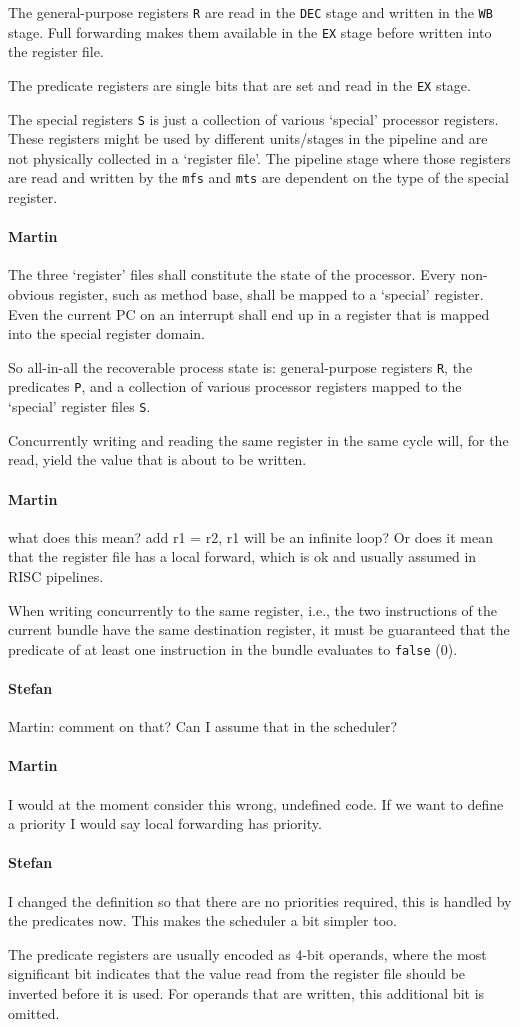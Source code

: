 \documentclass{IEEEtran}
\newcommand{\code}[1]{{\texttt{#1}}}
\newcommand{\comment}[3]{\paragraph*{\textbf{#1}}{\color{#3}#2}}
\newcommand{\martin}[1]{\comment{Martin}{#1}{Blue}}
\newcommand{\stefan}[1]{\comment{Stefan}{#1}{RoyalPurple}}
\begin{document}
The general-purpose registers \texttt{R} are read in the \code{DEC} stage
and written in the \code{WB} stage. Full forwarding makes them available
in the \code{EX} stage before written into the register file.

The predicate registers are single bits that are set and read in the \code{EX}
stage.

The special registers \code{S} is just a collection of various `special'
processor registers. These registers might be used by different units/stages
in the pipeline and are not physically collected in a `register file'.
The pipeline stage where those registers are read and written by the
\code{mfs} and \code{mts} are dependent on the type of the special
register.

\martin{The three `register' files shall constitute the state of the processor.
Every non-obvious register, such as method base, shall be mapped to a
`special' register. Even the current PC on an interrupt shall end up in a
register that is mapped into the special register domain.}

So all-in-all the recoverable process state is: general-purpose registers
\code{R}, the predicates \code{P}, and a collection of various processor
registers mapped to the `special' register files \code{S}.

Concurrently writing and reading the same register in the same cycle will, for
the read, yield the value that is about to be written.
\martin{what does this mean? add r1 = r2, r1 will be an infinite loop?
Or does it mean that the register file has a local forward, which is ok and
usually assumed in RISC pipelines.}

When writing concurrently to the same register, i.e., the two instructions of
the current bundle have the same destination register, 
it must be guaranteed that the predicate of at least one instruction in the bundle
evaluates to \texttt{false} (0).
\stefan{Martin: comment on that? Can I assume that in the scheduler?}
\martin{I would at the moment consider this wrong, undefined code.
If we want to define a priority I would say local forwarding has priority.}
\stefan{I changed the definition so that there are no priorities required, this is handled by the predicates now. This makes the
scheduler a bit simpler too.}

The predicate registers are usually encoded as $4$-bit operands, where the most
significant bit indicates that the value read from the register file should be
inverted before it is used. For operands that are written, this additional bit
is omitted.
\end{document}
